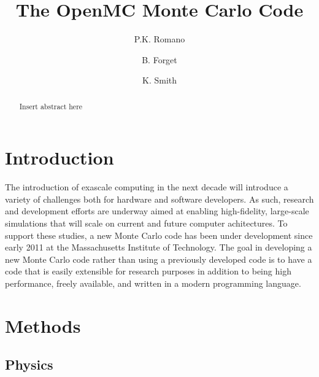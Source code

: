 \documentclass{elsarticle}
\begin{document}
\title{The OpenMC Monte Carlo Code}
\author[mit]{P.K. Romano}

\author[mit]{B. Forget}

\author[mit]{K. Smith}

\address[mit]{Massachusetts Institute of Technology, Department of Nuclear
  Science and Engineering, 77 Massachusetts Avenue, Building 24-213, Cambridge,
  MA 02141}

\begin{abstract}
Insert abstract here
\end{abstract}

\maketitle

\section{Introduction}

The introduction of exascale computing in the next decade will introduce a
variety of challenges both for hardware and software developers. As such,
research and development efforts are underway aimed at enabling high-fidelity,
large-scale simulations that will scale on current and future computer
achitectures. To support these studies, a new Monte Carlo code has been under
development since early 2011 at the Massachusetts Institute of Technology. The
goal in developing a new Monte Carlo code rather than using a previously
developed code is to have a code that is easily extensible for research purposes
in addition to being high performance, freely available, and written in a modern
programming language.

\section{Methods}

\subsection{Physics}
\end{document}
